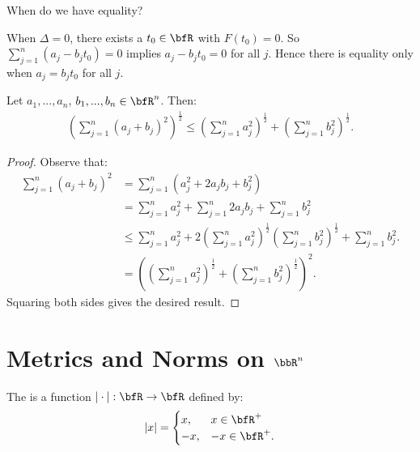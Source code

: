     \begin{question}
        When do we have equality?
    \end{question} 
        \begin{answer}
            When $\Delta = 0$, there exists a $t_0 \in \bfR$ with $F(t_0) = 0$. So $\sum_{j=1}^n(a_j - b_j t_0) = 0$ implies $a_j - b_j t_0 = 0$ for all $j$. Hence there is equality only when $a_j = b_j t_0$ for all $j$.
        \end{answer}

    \begin{proposition}\label{prop:triangle-ineq}
        Let $a_1,...,a_n$, $b_1,...,b_n \in \bfR^n$. Then:
            \begin{equation*}
            \begin{split}
                \left(\sum_{j=1}^n (a_j+b_j)^2 \right)^\frac{1}{2} \leq \left(\sum_{j=1}^n a_j^2\right)^\frac{1}{2} + \left(\sum_{j=1}^n b_j^2 \right)^\frac{1}{2}.
            \end{split}
            \end{equation*}
    \end{proposition}
        \begin{proof}
            Observe that:
                \begin{equation*}
                \begin{split}
                    \sum_{j=1}^n(a_j + b_j)^2
                    & = \sum_{j=1}^n(a_j^2 + 2a_jb_j + b_j^2) \\
                    & = \sum_{j=1}^n a_j^2 + \sum_{j=1}^n2a_jb_j +\sum_{j=1}^nb_j^2 \\
                    & \leq \sum_{j=1}^n a_j^2 + 2\left(\sum_{j=1}^na_j^2\right)^\frac{1}{2}\left(\sum_{j=1}^nb_j^2\right)^\frac{1}{2} + \sum_{j=1}^n b_j^2. \\
                    & = \left(\left(\sum_{j=1}^na_j^2\right)^\frac{1}{2} + \left(\sum_{j=1}^n b_j^2\right)^\frac{1}{2}\right)^2.
                \end{split}
                \end{equation*}
            Squaring both sides gives the desired result.
        \end{proof}

\section{Metrics and Norms on $\bbR^n$}
    \begin{definition}
        The  is a function $|\cdot|: \bfR \rightarrow \bfR$ defined by:
            \begin{equation*}
                |x|=
            \begin{cases}
                x, & x \in \bfR^+ \\
                -x, & -x \in \bfR^+.
            \end{cases}
            \end{equation*}
    \end{definition}

